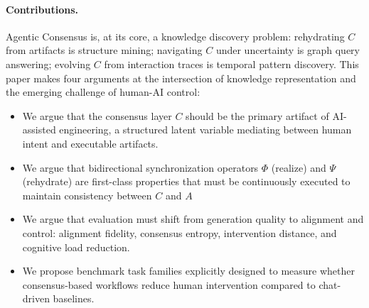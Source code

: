 \paragraph{Contributions.}
Agentic Consensus is, at its core, a knowledge discovery problem: rehydrating $C$ from artifacts is structure mining; navigating $C$ under uncertainty is graph query answering; evolving $C$ from interaction traces is temporal pattern discovery.
This paper makes four arguments at the intersection of knowledge representation and the emerging challenge of human-AI control:
\begin{itemize}[leftmargin=*, itemsep=2pt]
  \item We argue that the consensus layer $C$ should be the primary artifact of AI-assisted engineering, a structured latent variable mediating between human intent and executable artifacts.
  \item We argue that bidirectional synchronization operators $\Phi$ (realize) and $\Psi$ (rehydrate) are first-class properties that must be continuously executed to maintain consistency between $C$ and $A$
  \item We argue that evaluation must shift from generation quality to alignment and control: alignment fidelity, consensus entropy, intervention distance, and cognitive load reduction.
  \item We propose benchmark task families explicitly designed to measure whether consensus-based workflows reduce human intervention compared to chat-driven baselines.
\end{itemize}

